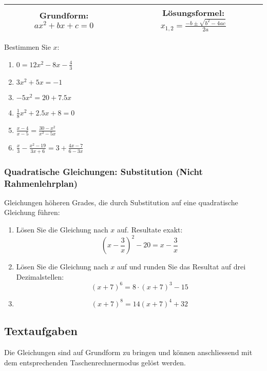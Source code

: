   \begin{tabular}{|c|c|}%
    \hline%
Grundform: $ax^2 + bx +c = 0$ & Lösungsformel: $x_{1,2} = \frac{-b \pm \sqrt{b^2 - 4ac}}{2a}$\\%
    \hline%
    \end{tabular}%

  Bestimmen Sie $x$:
  \begin{multicols}{3}
  \begin{enumerate}
  \item $0 = 12x^2 - 8x - \frac{4}{3}$
  \item $3x^2 + 5x = -1$
  \item $-5x^2 = 20 + 7.5x$
  \item $\frac{1}{8}x^2 + 2.5x + 8 = 0$
  \item $\frac{x-4}{x-5} = \frac{30-x^2}{x^2-5x}$
    \item $\frac{x}{3} - \frac{x^2-19}{3x+6} = 3 + \frac{4x-7}{6-3x}$
    \end{enumerate}
    \end{multicols}




  \subsubsection{Quadratische Gleichungen: Substitution (Nicht Rahmenlehrplan)}
  Gleichungen höheren Grades, die durch Substitution auf eine
  quadratische Gleichung führen:

  \begin{enumerate}
  \item Lösen Sie die Gleichung nach $x$ auf. Resultate exakt:
    $$\left(x-\frac{3}{x}\right)^2 - 20 = x - \frac{3}{x}$$

  \item Lösen Sie die Gleichung nach $x$ auf und runden Sie das
    Resultat auf drei Dezimalstellen:
    $$(x+7)^6 = 8\cdot (x+7)^3 - 15$$

  \item $$(x+7)^8 = 14(x+7)^4 + 32$$
  \end{enumerate}


\subsection{Textaufgaben}

Die Gleichungen sind auf Grundform zu bringen und können anschliessend
mit dem entsprechenden Taschenrechnermodus gelöst werden.


